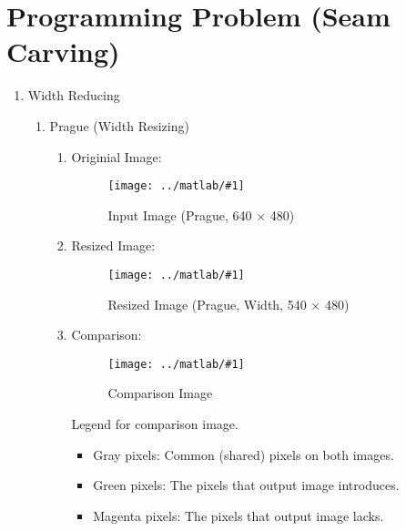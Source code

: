 \documentclass{article}
\newcommand{\listFigure}[3]{ \begin{figure}[H]
\texttt{[image: ../matlab/\#1]}
		\caption{#2\label{fig:#3}}
	\end{figure}		
}
\begin{document}
\label{Programming Problem (Seam Carving)}
\section{Programming Problem (Seam Carving)}
\begin{enumerate}
	\label{Answer 1}
	\item Width Reducing
	
	\begin{enumerate} 
		\item Prague (Width Resizing) \\
		\begin{enumerate}
			\item Originial Image: \\
			\listFigure{inputSeamCarvingPrague.jpg}{Input Image (Prague, 640 $\times$
			480)}{inputSeamCarvingPrague}
			\pagebreak
			\item Resized Image: \\
			\listFigure{outputReduceWidthPrague.png}{Resized Image (Prague, Width, 540 $\times$ 480)}{outputReduceWidthPrague}
			\pagebreak
			\item Comparison: \\
			\listFigure{outputReduceWidthInputvsDynamicPrague.png}{Comparison
			Image}{outputReduceWidthInputvsDynamicPrague}
			Legend for comparison image.
			\begin{itemize}
				\item Gray pixels: Common (shared) pixels on both images.
				\item Green pixels: The pixels that output image introduces.
				\item Magenta pixels: The pixels that output image lacks.
			\end{itemize}
		\end{enumerate}
		

\end{enumerate}
\end{enumerate}
\end{document}
